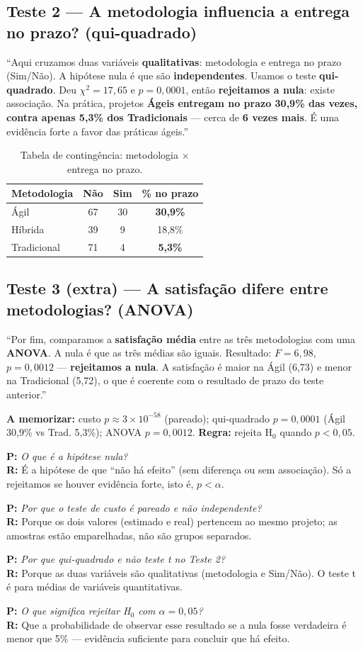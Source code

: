 \documentclass[a4paper, 11pt]{article}
\newcommand{\pergunta}[2]{\par\smallskip\noindent\textbf{P:} \emph{#1}\\
  \textbf{R:} #2}
\begin{document}
\subsection{Teste 2 --- A metodologia influencia a entrega no prazo? (qui-quadrado)}
\begin{roteiro}
``Aqui cruzamos duas variáveis \textbf{qualitativas}: metodologia e entrega no prazo (Sim/Não).
A hipótese nula é que são \textbf{independentes}. Usamos o teste \textbf{qui-quadrado}. Deu
$\chi^2=17{,}65$ e $p=0{,}0001$, então \textbf{rejeitamos a nula}: existe associação. Na prática,
projetos \textbf{Ágeis entregam no prazo 30,9\% das vezes, contra apenas 5,3\% dos
Tradicionais} --- cerca de \textbf{6 vezes mais}. É uma evidência forte a favor das práticas
ágeis.''
\end{roteiro}

\begin{table}[H]
\centering
\caption{Tabela de contingência: metodologia $\times$ entrega no prazo.}
\begin{tabular}{@{} l c c c @{}}
\toprule
\textbf{Metodologia} & \textbf{Não} & \textbf{Sim} & \textbf{\% no prazo} \\
\midrule
Ágil        & 67 & 30 & \textbf{30,9\%} \\
Híbrida     & 39 & 9  & 18,8\% \\
Tradicional & 71 & 4  & \textbf{5,3\%} \\
\bottomrule
\end{tabular}
\end{table}

\subsection{Teste 3 (extra) --- A satisfação difere entre metodologias? (ANOVA)}
\begin{roteiro}
``Por fim, comparamos a \textbf{satisfação média} entre as três metodologias com uma
\textbf{ANOVA}. A nula é que as três médias são iguais. Resultado: $F=6{,}98$, $p=0{,}0012$ ---
\textbf{rejeitamos a nula}. A satisfação é maior na Ágil (6,73) e menor na Tradicional (5,72),
o que é coerente com o resultado de prazo do teste anterior.''
\end{roteiro}

\textbf{A memorizar:} custo $p\approx3\times10^{-58}$ (pareado); qui-quadrado $p=0{,}0001$
(Ágil 30,9\% vs Trad. 5,3\%); ANOVA $p=0{,}0012$. \textbf{Regra:} rejeita H$_0$ quando $p<0{,}05$.

\pergunta{O que é a hipótese nula?}{É a hipótese de que ``não há efeito'' (sem diferença ou sem associação). Só a rejeitamos se houver evidência forte, isto é, $p<\alpha$.}
\pergunta{Por que o teste de custo é pareado e não independente?}{Porque os dois valores (estimado e real) pertencem ao mesmo projeto; as amostras estão emparelhadas, não são grupos separados.}
\pergunta{Por que qui-quadrado e não teste t no Teste 2?}{Porque as duas variáveis são qualitativas (metodologia e Sim/Não). O teste t é para médias de variáveis quantitativas.}
\pergunta{O que significa rejeitar H$_0$ com $\alpha=0{,}05$?}{Que a probabilidade de observar esse resultado se a nula fosse verdadeira é menor que 5\% --- evidência suficiente para concluir que há efeito.}
\end{document}

